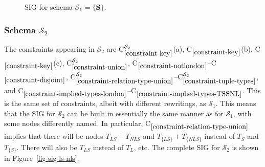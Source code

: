 \documentclass{sig-alternate-05-2015}
\newcounter{constraint}
\newcommand{\LS}{\ensuremath{\mathit{LS}}}
\newcommand{\NLS}{\ensuremath{\mathit{NLS}}}
\newcommand{\LSsub}{\ensuremath{\mathit{L}}}
\newcommand{\T}[1]{\ensuremath{T_{#1}}}
\newcommand{\TT}[1]{\ensuremath{T_{\{#1\}}}}
\newcommand{\TLSPlusNLS}{\ensuremath{\T{\LS} + \T{\NLS}}}
\newcommand{\TTLSPlusNLS}{\ensuremath{\TT{\LS} + \TT{\NLS}}}
\newcommand{\SC}[1]{\ensuremath{\mathcal{S}_{#1}}}
\newcommand{\Constraint}[2][]{C\ensuremath{_{#2}\ifx&#1&\else^{#1}\fi}}
\begin{document}
\begin{figure*}
    \caption{SIG for schema \(\bm{\SC{1} = \{S\}}\).}
    \label{fig-sig-s}
\end{figure*}





\subsubsection{Schema \(\SC{2}\)}
\label{sec-sigs-s-ii}

\noindent The constraints appearing in \(\SC{2}\) are \Constraint[\SC{2}]{\ref{constraint-key}}(a), \Constraint{\ref{constraint-key}}(b), \Constraint{\ref{constraint-key}}(c), \Constraint[\SC{2}]{\ref{constraint-union}}, \Constraint{\ref{constraint-notlondon}}--\Constraint{\ref{constraint-disjoint}}, \Constraint[\SC{2}]{\ref{constraint-relation-type-union}}--\Constraint[\SC{2}]{\ref{constraint-tuple-types}}, and \Constraint{\ref{constraint-implied-types-london}}--\Constraint{\ref{constraint-implied-types-TSSNL}}. This is the same set of constraints, albeit with different rewritings, as \(\SC{1}\). This means that the SIG for \(\SC{2}\) can be built in essentially the same manner as for \(\SC{1}\), with some nodes differently named. In particular, \Constraint{\ref{constraint-relation-type-union}} implies that there will be nodes \(\TLSPlusNLS\) and \(\TTLSPlusNLS\) instead of \(\T{S}\) and \(\TT{S}\). There will also be \(\T{\LS}\) instead of \(\T{\LSsub}\), etc. The complete SIG for \(\SC{2}\) is shown in Figure~\ref{fig-sig-ls-nls}.
\end{document}

